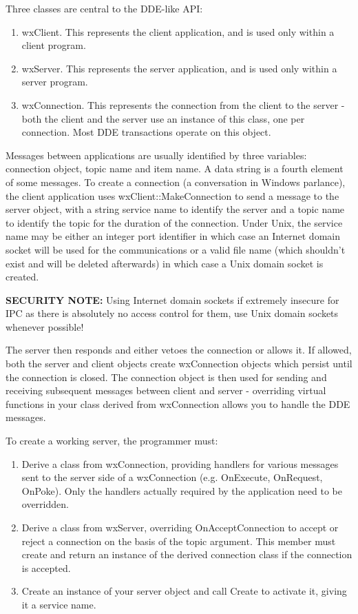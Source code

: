 Three classes are central to the DDE-like API:

\begin{enumerate}\itemsep=0pt
\item wxClient. This represents the client application, and is used
only within a client program.
\item wxServer. This represents the server application, and is used
only within a server program.
\item wxConnection. This represents the connection from the
client to the server - both the client and the server use an
instance of this class, one per connection. Most DDE transactions
operate on this object.
\end{enumerate}

Messages between applications are usually identified by three
variables: connection object, topic name and item name.  A data
string is a fourth element of some messages. To create a
connection (a conversation in Windows parlance), the client
application uses wxClient::MakeConnection to send a message to the
server object, with a string service name to identify the server
and a topic name to identify the topic for the duration of the
connection. Under Unix, the service name may be either an integer
port identifier in which case an Internet domain socket will be
used for the communications or a valid file name (which shouldn't
exist and will be deleted afterwards) in which case a Unix domain
socket is created.

{\bf SECURITY NOTE:} Using Internet domain sockets if extremely insecure for
IPC as there is absolutely no access control for them, use Unix domain sockets
whenever possible!

The server then responds and either vetoes the connection or
allows it. If allowed, both the server and client objects create
wxConnection objects which persist until the connection is
closed. The connection object is then used for sending and
receiving subsequent messages between client and server -
overriding virtual functions in your class derived from
wxConnection allows you to handle the DDE messages.

To create a working server, the programmer must:

\begin{enumerate}\itemsep=0pt
\item Derive a class from wxConnection, providing handlers for various messages sent to the server
side of a wxConnection (e.g. OnExecute, OnRequest, OnPoke). Only
the handlers actually required by the application need to be
overridden.
\item Derive a class from wxServer, overriding OnAcceptConnection
to accept or reject a connection on the basis of the topic
argument. This member must create and return an instance of the
derived connection class if the connection is accepted.
\item Create an instance of your server object and call Create to
activate it, giving it a service name.
\end{enumerate}

